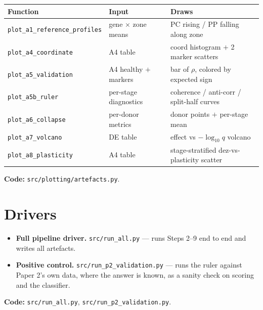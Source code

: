 \documentclass[11pt]{article}
\newcommand{\code}[1]{\texttt{\small #1}}
\begin{document}
\begin{center}
\begin{tabular}{@{}l l l@{}}
\toprule
\textbf{Function} & \textbf{Input} & \textbf{Draws} \\
\midrule
\code{plot\_a1\_reference\_profiles} & gene $\times$ zone means & PC rising / PP falling along zone \\
\code{plot\_a4\_coordinate}         & A4 table                & coord histogram $+$ 2 marker scatters \\
\code{plot\_a5\_validation}         & A4 healthy $+$ markers  & bar of $\rho$, colored by expected sign \\
\code{plot\_a5b\_ruler}             & per-stage diagnostics   & coherence / anti-corr / split-half curves \\
\code{plot\_a6\_collapse}           & per-donor metrics       & donor points $+$ per-stage mean \\
\code{plot\_a7\_volcano}            & DE table                & effect vs $-\log_{10} q$ volcano \\
\code{plot\_a8\_plasticity}         & A4 table                & stage-stratified dez-vs-plasticity scatter \\
\bottomrule
\end{tabular}
\end{center}

\medskip
\noindent\textbf{Code:} \code{src/plotting/artefacts.py}.

\section{Drivers}

\begin{itemize}[leftmargin=1.4em]
  \item \textbf{Full pipeline driver.} \code{src/run\_all.py} --- runs Steps 2--9 end to end and
        writes all artefacts.
  \item \textbf{Positive control.} \code{src/run\_p2\_validation.py} --- runs the ruler against
        Paper 2's own data, where the answer is known, as a sanity check on scoring and the
        classifier.
\end{itemize}

\medskip
\noindent\textbf{Code:} \code{src/run\_all.py}, \code{src/run\_p2\_validation.py}.
\end{document}
